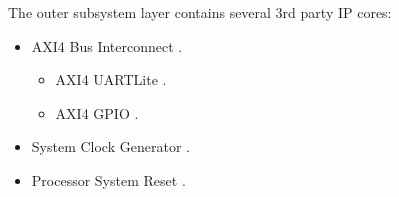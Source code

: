 
The outer subsystem layer contains several 3rd party IP cores:

\begin{itemize}
\item AXI4 Bus Interconnect \cite{SCARV:XILINX:AXI-IC}.

\begin{itemize}
\item AXI4 UARTLite \cite{SCARV:XILINX:UART-Lite}.
\item AXI4 GPIO \cite{SCARV:XILINX:GPIO}.
\end{itemize}

\item System Clock Generator \cite{SCARV:XILINX:ClockingWizard}.

\item Processor System Reset \cite{SCARV:XILINX:ProcessorReset}.

\end{itemize}
